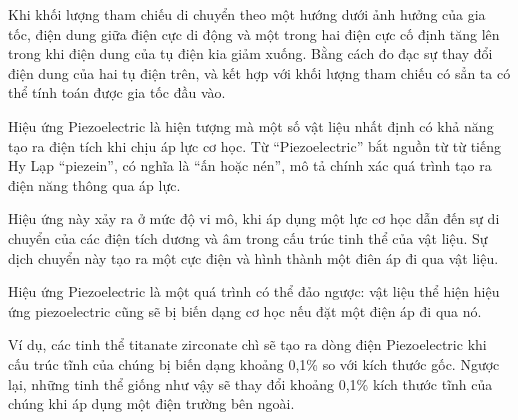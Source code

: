 \indent Khi khối lượng tham chiếu di chuyển theo một hướng dưới ảnh hưởng của gia tốc, điện dung giữa điện cực di động và một trong hai điện cực cố định tăng lên trong khi điện dung của tụ điện kia giảm xuống. Bằng cách đo đạc sự thay đổi điện dung của hai tụ điện trên, và kết hợp với khối lượng tham chiếu có sẳn ta có thể tính toán được gia tốc đầu vào.

\indent Hiệu ứng Piezoelectric là hiện tượng mà một số vật liệu nhất định có khả năng tạo ra điện tích khi chịu áp lực cơ học. Từ “Piezoelectric” bắt nguồn từ từ tiếng Hy Lạp “piezein”, có nghĩa là “ấn hoặc nén”, mô tả chính xác quá trình tạo ra điện năng thông qua áp lực.

\indent Hiệu ứng này xảy ra ở mức độ vi mô, khi áp dụng một lực cơ học dẫn đến sự di chuyển của các điện tích dương và âm trong cấu trúc tinh thể của vật liệu. Sự dịch chuyển này tạo ra một cực điện và hình thành một điên áp đi qua vật liệu.

\indent Hiệu ứng Piezoelectric là một quá trình có thể đảo ngược: vật liệu thể hiện hiệu ứng piezoelectric cũng sẽ bị biến dạng cơ học nếu đặt một điện áp đi qua nó.

Ví dụ, các tinh thể titanate zirconate chì sẽ tạo ra dòng điện Piezoelectric khi cấu trúc tĩnh của chúng bị biến dạng khoảng 0,1\% so với kích thước gốc. Ngược lại, những tinh thể giống như vậy sẽ thay đổi khoảng 0,1\% kích thước tĩnh của chúng khi áp dụng một điện trường bên ngoài.

